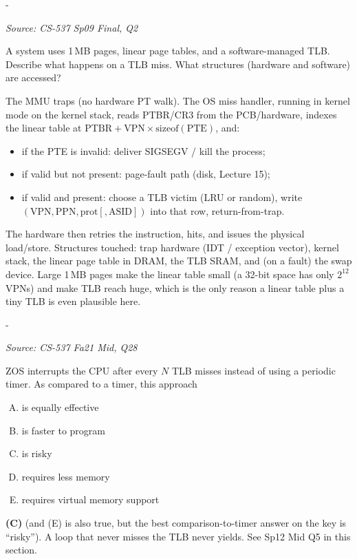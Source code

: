 \documentclass[11pt,a4paper]{article}
\makeatletter
\newcommand{\keepspace}[1]{\par\penalty-100\begingroup
  \setlength{\dimen@}{#1}\dimen@ii\pagegoal\advance\dimen@ii-\pagetotal
  \ifdim\dimen@>\dimen@ii\ifdim\dimen@ii>\z@\vfil\fi\break\fi\endgroup}
\newcounter{qn}[section]
\newenvironment{Qn}[4]{%
  \refstepcounter{qn}\keepspace{7\baselineskip}%
  \begin{tcolorbox}[qboxstyle, title={Q\thesection.\theqn\ \ [#1 \textbar\ #2]\ \ #4}]%
  {\footnotesize\color{g3}\textit{Source: #3}}\par\smallskip%
}{%
  \end{tcolorbox}%
}
\newenvironment{Sol}{%
  \begin{tcolorbox}[sboxstyle, title={Solution}]%
}{%
  \end{tcolorbox}\vspace{0.35em}%
}
\makeatother
\begin{document}
\begin{Qn}{Easy-Medium}{Lect 13}{CS-537 Sp09 Final, Q2}{What happens on a software-managed TLB miss?}
A system uses 1\,MB pages, linear page tables, and a software-managed
TLB. Describe what happens on a TLB miss. What structures (hardware
and software) are accessed?
\end{Qn}
\begin{Sol}
The MMU traps (no hardware PT walk). The OS miss handler, running in
kernel mode on the kernel stack, reads PTBR/CR3 from the PCB/hardware,
indexes the linear table at
$\mathrm{PTBR}+\mathrm{VPN}\times\mathrm{sizeof(PTE)}$, and:
\begin{itemize}
\item if the PTE is invalid: deliver SIGSEGV / kill the process;
\item if valid but not present: page-fault path (disk, Lecture 15);
\item if valid and present: choose a TLB victim (LRU or random), write
      $(\mathrm{VPN},\mathrm{PPN},\mathrm{prot}[,\mathrm{ASID}])$ into
      that row, return-from-trap.
\end{itemize}
The hardware then retries the instruction, hits, and issues the
physical load/store. Structures touched: trap hardware (IDT / exception
vector), kernel stack, the linear page table in DRAM, the TLB SRAM, and
(on a fault) the swap device. Large 1\,MB pages make the linear table
small (a 32-bit space has only $2^{12}$ VPNs) and make TLB reach huge,
which is the only reason a linear table plus a tiny TLB is even
plausible here.
\end{Sol}

\begin{Qn}{Easy-Medium}{Lect 13}{CS-537 Fa21 Mid, Q28}{Interrupt the CPU after every $N$ TLB misses}
ZOS interrupts the CPU after every $N$ TLB misses instead of using a
periodic timer. As compared to a timer, this approach
\begin{enumerate}[(A)]
\item is equally effective
\item is faster to program
\item is risky
\item requires less memory
\item requires virtual memory support
\end{enumerate}
\end{Qn}
\begin{Sol}
\textbf{(C)} (and (E) is also true, but the best comparison-to-timer
answer on the key is ``risky''). A loop that never misses the TLB never
yields. See Sp12 Mid Q5 in this section.
\end{Sol}
\end{document}
